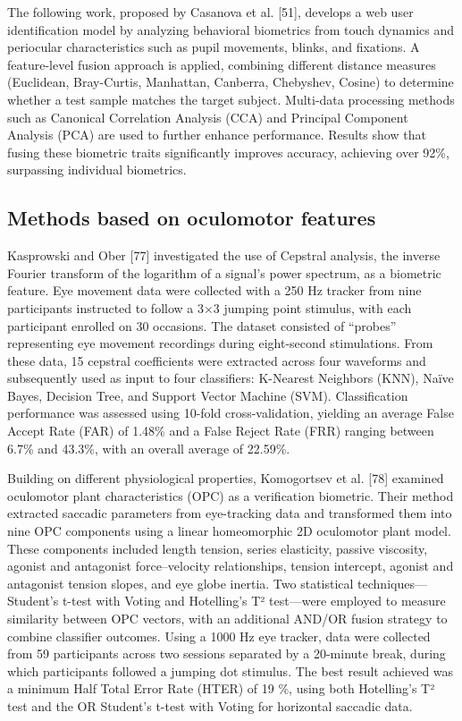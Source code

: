 \documentclass{article}
\begin{document}
The following work, proposed by Casanova et al. [51], develops a web user identification model by analyzing behavioral biometrics from touch dynamics and periocular characteristics such as pupil movements, blinks, and fixations.
A feature-level fusion approach is applied, combining different distance measures (Euclidean, Bray-Curtis, Manhattan, Canberra, Chebyshev, Cosine) to determine whether a test sample matches the target subject.
Multi-data processing methods such as Canonical Correlation Analysis (CCA) and Principal Component Analysis (PCA) are used to further enhance performance.
Results show that fusing these biometric traits significantly improves accuracy, achieving over 92\%, surpassing individual biometrics.

\subsection{Methods based on oculomotor features}

Kasprowski and Ober [77] investigated the use of Cepstral analysis, the inverse Fourier transform of the logarithm of a signal's power spectrum, as a biometric feature.
Eye movement data were collected with a 250 Hz tracker from nine participants instructed to follow a 3×3 jumping point stimulus, with each participant enrolled on 30 occasions. 
The dataset consisted of “probes” representing eye movement recordings during eight-second stimulations. 
From these data, 15 cepstral coefficients were extracted across four waveforms and subsequently used as input to four classifiers: K-Nearest Neighbors (KNN), Naïve Bayes, Decision Tree, and Support Vector Machine (SVM). 
Classification performance was assessed using 10-fold cross-validation, yielding an average False Accept Rate (FAR) of 1.48\% and a False Reject Rate (FRR) ranging between 6.7\% and 43.3\%, with an overall average of 22.59\%.

Building on different physiological properties, Komogortsev et al. [78] examined oculomotor plant characteristics (OPC) as a verification biometric. 
Their method extracted saccadic parameters from eye-tracking data and transformed them into nine OPC components using a linear homeomorphic 2D oculomotor plant model. 
These components included length tension, series elasticity, passive viscosity, agonist and antagonist force–velocity relationships, tension intercept, agonist and antagonist tension slopes, and eye globe inertia. 
Two statistical techniques—Student's t-test with Voting and Hotelling's T² test—were employed to measure similarity between OPC vectors, with an additional AND/OR fusion strategy to combine classifier outcomes. 
Using a 1000 Hz eye tracker, data were collected from 59 participants across two sessions separated by a 20-minute break, during which participants followed a jumping dot stimulus. 
The best result achieved was a minimum Half Total Error Rate (HTER) of 19 \%, using both Hotelling's T² test and the OR Student's t-test with Voting for horizontal saccadic data.
\end{document}

